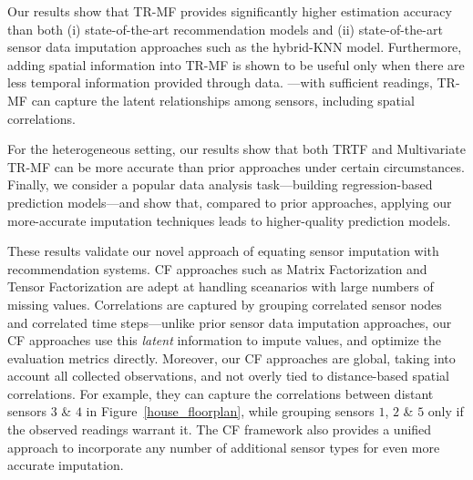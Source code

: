 Our results show that TR-MF provides significantly higher estimation accuracy than 
both (i) state-of-the-art recommendation models and (ii) state-of-the-art sensor data imputation approaches 
such as the hybrid-KNN model.
Furthermore, adding spatial information into TR-MF is shown to be useful only when there are less temporal information provided through data. ---with sufficient readings, TR-MF can capture the latent relationships among sensors, including spatial correlations.  

For the heterogeneous setting, our results show that both TRTF and
Multivariate TR-MF can be more accurate than prior approaches under certain circumstances. Finally, we consider a popular data analysis task---building regression-based prediction models---and show that, compared to prior approaches, applying our more-accurate imputation techniques leads to higher-quality prediction models.

These results validate our novel approach of equating sensor imputation with recommendation systems.  CF approaches such as Matrix Factorization and Tensor Factorization are adept at handling sceanarios with large numbers of missing values.  Correlations are captured by grouping correlated sensor nodes and correlated time
steps---unlike prior sensor data imputation approaches, our CF
approaches use this {\em latent} information to impute values, and optimize the evaluation metrics directly. 
Moreover, our CF approaches are global, taking into account all
collected observations, and not overly tied to distance-based spatial
correlations.  For example, they can capture the correlations between
distant sensors $3$ \& $4$ in Figure~\ref{house_floorplan}, while
grouping sensors $1$, $2$ \& $5$ only if the observed readings warrant
it.  The CF framework also provides a unified approach to incorporate
any number of additional sensor types for even more accurate imputation.






